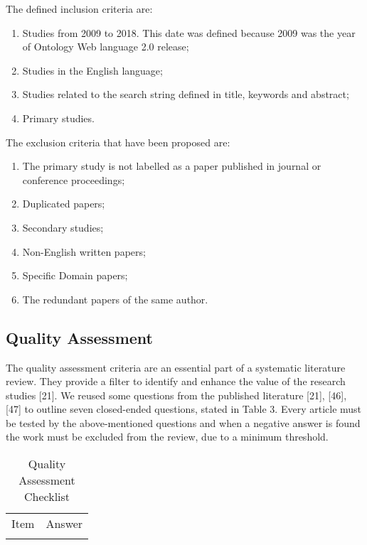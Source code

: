 \documentclass[peerreview]{IEEEtran}
\begin{document}
The defined inclusion criteria are:


\begin{enumerate}
    \item Studies from 2009 to 2018. This date was defined because 2009 was the year of Ontology Web language 2.0 release;
    \item Studies in the English language; 
    \item Studies related to the search string defined in title, keywords and abstract; 
    \item Primary studies.
\end{enumerate}

The exclusion criteria that have been proposed are:


\begin{enumerate}
\item The primary study is not labelled as a paper published in journal or conference proceedings;
\item Duplicated papers; 
\item Secondary studies;
\item Non-English written papers;
\item Specific Domain papers;
\item The redundant papers of the same author.
\end{enumerate}


\subsection{Quality Assessment}

The quality assessment criteria are an essential part of a systematic literature review. They provide a filter to identify and enhance the value of the research studies [21]. We reused some questions from the published literature [21], [46], [47] to outline seven closed-ended questions, stated in Table 3. Every article must be tested by the above-mentioned questions and when a negative answer is found the work must be excluded from the review, due to a minimum threshold.


\begin{table}[]
    \centering
    \begin{tabular}{c|c}
        Item & Answer \\
         & 
    \end{tabular}
    \caption{Quality Assessment Checklist}
    \label{tab:my_label}
\end{table}
\end{document}
